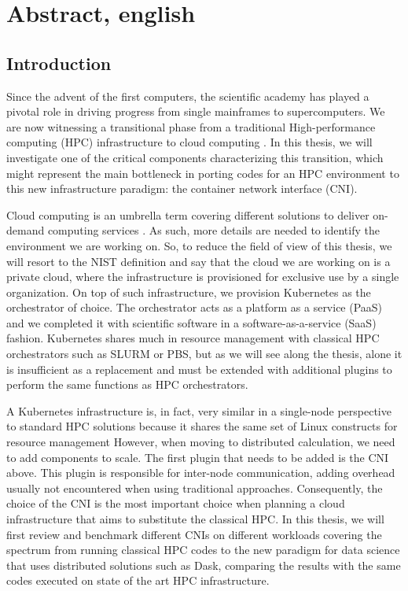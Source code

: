 \chapter{Abstract, english}

\section*{Introduction}

Since the advent of the first computers, the scientific academy has played a
pivotal role in driving progress from single mainframes to supercomputers.
We are now witnessing a transitional phase from a traditional High-performance
computing (HPC) infrastructure to cloud computing \cite{Surbiryala2019CloudCH}.
In this thesis, we will investigate one of the critical components
characterizing this transition, which might represent the main bottleneck in
porting codes for an HPC environment to this new infrastructure paradigm: the
container network interface (CNI).


Cloud computing is an umbrella term covering different solutions to deliver
on-demand computing services \cite{rajkumar2011}.
As such, more details are needed to identify the environment we are working on.
So, to reduce the field of view of this thesis, we will resort to the
NIST\cite{nistdef} definition and say that the cloud we are working on is a
private cloud, where the infrastructure is provisioned for exclusive use by a
single organization.
On top of such infrastructure, we provision Kubernetes as the orchestrator of
choice. The orchestrator acts as a platform as a service (PaaS) and we completed
it with scientific software in a software-as-a-service (SaaS) fashion.
Kubernetes shares much in resource management with classical HPC orchestrators
such as SLURM or PBS, but as we will see along the thesis, alone it is
insufficient as a replacement and must be extended with additional plugins to
perform the same functions as HPC orchestrators.


A Kubernetes infrastructure is, in fact, very similar in a single-node
perspective to standard HPC solutions because it shares the same set of Linux
constructs for resource management \cite{jain2023} However, when moving to distributed
calculation, we need to add components to scale.
The first plugin that needs to be added is the CNI above.
This plugin is responsible for inter-node communication, adding overhead usually
not encountered when using traditional approaches. Consequently, the choice of
the CNI is the most important choice when planning a cloud infrastructure that
aims to substitute the classical HPC. In this thesis, we will first review and
benchmark different CNIs on different workloads covering the spectrum from
running classical HPC codes to the new paradigm for data science that uses
distributed solutions such as Dask\cite{dask2015}, comparing the results with the same codes
executed on state of the art HPC infrastructure.

